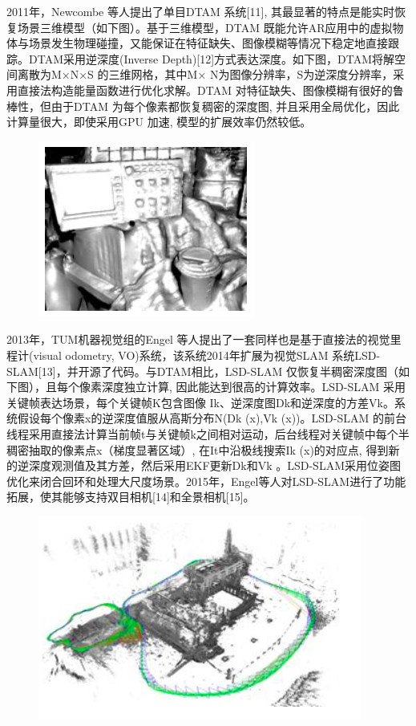 2011年，Newcombe 等人提出了单目DTAM 系统[11], 其最显著的特点是能实时恢复场景三维模型（如下图）。基于三维模型，DTAM 既能允许AR应用中的虚拟物体与场景发生物理碰撞，又能保证在特征缺失、图像模糊等情况下稳定地直接跟踪。DTAM采用逆深度(Inverse Depth)[12]方式表达深度。如下图，DTAM将解空间离散为M×N×S 的三维网格，其中M× N为图像分辨率，S为逆深度分辨率，采用直接法构造能量函数进行优化求解。DTAM 对特征缺失、图像模糊有很好的鲁棒性，但由于DTAM 为每个像素都恢复稠密的深度图, 并且采用全局优化，因此计算量很大，即使采用GPU 加速, 模型的扩展效率仍然较低。
\begin{figure}[H]%
	\centering  %
	\includegraphics[width=0.7\linewidth]{image/Talk/10.png}  %

\end{figure}


2013年，TUM机器视觉组的Engel 等人提出了一套同样也是基于直接法的视觉里程计(visual odometry, VO)系统，该系统2014年扩展为视觉SLAM 系统LSD-SLAM[13]，并开源了代码。与DTAM相比，LSD-SLAM 仅恢复半稠密深度图（如下图），且每个像素深度独立计算, 因此能达到很高的计算效率。LSD-SLAM 采用关键帧表达场景，每个关键帧K包含图像 Ik、逆深度图Dk和逆深度的方差Vk。系统假设每个像素x的逆深度值服从高斯分布N(Dk (x),Vk (x))。LSD-SLAM 的前台线程采用直接法计算当前帧t与关键帧k之间相对运动，后台线程对关键帧中每个半稠密抽取的像素点x（梯度显著区域）, 在It中沿极线搜索Ik (x)的对应点, 得到新的逆深度观测值及其方差，然后采用EKF更新Dk和Vk 。LSD-SLAM采用位姿图优化来闭合回环和处理大尺度场景。2015年，Engel等人对LSD-SLAM进行了功能拓展，使其能够支持双目相机[14]和全景相机[15]。


\begin{figure}[H]%
	\centering  %
	\includegraphics[width=0.7\linewidth]{image/Talk/11.png}  %

\end{figure}


